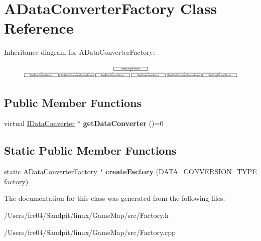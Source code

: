 \hypertarget{class_a_data_converter_factory}{}\section{A\+Data\+Converter\+Factory Class Reference}
\label{class_a_data_converter_factory}
Inheritance diagram for A\+Data\+Converter\+Factory\+:\begin{figure}[H]
\begin{center}
\leavevmode
\includegraphics[height=0.734908cm]{class_a_data_converter_factory}
\end{center}
\end{figure}
\subsection*{Public Member Functions}
\begin{DoxyCompactItemize}
\item 
\hypertarget{class_a_data_converter_factory_a576415e450f58ae87d8754dc6843be10}{}virtual \hyperlink{class_i_data_converter}{I\+Data\+Converter} $\ast$ {\bfseries get\+Data\+Converter} ()=0\label{class_a_data_converter_factory_a576415e450f58ae87d8754dc6843be10}

\end{DoxyCompactItemize}
\subsection*{Static Public Member Functions}
\begin{DoxyCompactItemize}
\item 
\hypertarget{class_a_data_converter_factory_a494162241798246de7e59566d1a41231}{}static \hyperlink{class_a_data_converter_factory}{A\+Data\+Converter\+Factory} $\ast$ {\bfseries create\+Factory} (D\+A\+T\+A\+\_\+\+C\+O\+N\+V\+E\+R\+S\+I\+O\+N\+\_\+\+T\+Y\+P\+E factory)\label{class_a_data_converter_factory_a494162241798246de7e59566d1a41231}

\end{DoxyCompactItemize}


The documentation for this class was generated from the following files\+:\begin{DoxyCompactItemize}
\item 
/\+Users/fre04/\+Sandpit/linux/\+Game\+Map/src/Factory.\+h\item 
/\+Users/fre04/\+Sandpit/linux/\+Game\+Map/src/Factory.\+cpp\end{DoxyCompactItemize}

